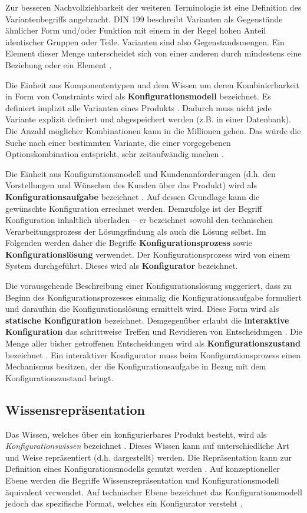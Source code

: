 \documentclass[11pt, a4paper, titlepage, listof=totoc, bibliography=totoc, index=totoc, twoside, openright, headings=normal, draft]{scrreprt}
\begin{document}
Zur besseren Nachvollziehbarkeit der weiteren Terminologie ist eine Definition des Variantenbegriffs angebracht. DIN 199 beschreibt Varianten als \glqq Gegenstände ähnlicher Form und/oder Funktion mit einem in der Regel hohen Anteil identischer Gruppen oder Teile\grqq{}. Varianten sind also Gegenstandsmengen. Ein Element dieser Menge unterscheidet sich von einer anderen durch mindestens eine Beziehung oder ein Element \citep{lutz11}.

Die Einheit aus Komponententypen und dem Wissen um deren Kombinierbarkeit in Form von Constraints wird als \textbf{Konfigurationsmodell} bezeichnet. Es definiert implizit alle Varianten eines Produkts \citep{soininen98}. Dadurch muss nicht jede Variante explizit definiert und abgespeichert werden (z.B. in einer Datenbank). Die Anzahl möglicher Kombinationen kann in die Millionen gehen. Das würde die Suche nach einer bestimmten Variante, die einer vorgegebenen Optionskombination entspricht, sehr zeitaufwändig machen \citep{falkner11}.

Die Einheit aus Konfigurationsmodell und Kundenanforderungen (d.h. den Vorstellungen und Wünschen des Kunden über das Produkt) wird als \textbf{Konfigurationsaufgabe} bezeichnet \citep{felferning14}. Auf dessen Grundlage kann die gewünschte Konfiguration errechnet werden. Demzufolge ist der Begriff Konfiguration inhaltlich überladen -- er bezeichnet sowohl den technischen Verarbeitungsprozess der Lösungsfindung als auch die Lösung selbst. Im Folgenden werden daher die Begriffe \textbf{Konfigurationsprozess} sowie \textbf{Konfigurationslösung} verwendet. Der Konfigurationsprozess wird von einem System durchgeführt. Dieses wird als \textbf{Konfigurator} bezeichnet.

Die vorausgehende Beschreibung einer Konfigurationslösung suggeriert, dass zu Beginn des Konfigurationsprozesses einmalig die Konfigurationsaufgabe formuliert und daraufhin die Konfigurationslösung ermittelt wird. Diese Form wird als \textbf{statische Konfiguration} bezeichnet. Demgegenüber erlaubt die \textbf{interaktive Konfiguration} das schrittweise Treffen und Revidieren von Entscheidungen \citep{hadzic04}. Die Menge aller bisher getroffenen Entscheidungen wird als \textbf{Konfigurationszustand} bezeichnet \citep{tactonTCsiteDevelopmentManual}. Ein interaktiver Konfigurator muss beim Konfigurationsprozess einen Mechanismus besitzen, der die Konfigurationsaufgabe in Bezug mit dem Konfigurationszustand bringt.

\subsection{Wissensrepräsentation}
\label{wissenrepraesentation}
Das Wissen, welches über ein konfigurierbares Produkt besteht, wird als  \emph{Konfigurationswissen} bezeichnet \citep{soininen98}. Dieses Wissen kann auf unterschiedliche Art und Weise repräsentiert (d.h. dargestellt) werden. Die Repräsentation kann zur Definition eines Konfigurationsmodells genutzt werden \citep{felferning14}. Auf konzeptioneller Ebene werden die Begriffe Wissensrepräsentation und Konfigurationsmodell äquivalent verwendet. Auf technischer Ebene bezeichnet das Konfigurationsmodell jedoch das spezifische Format, welches ein Konfigurator versteht \citep{soininen98}.
\end{document}
